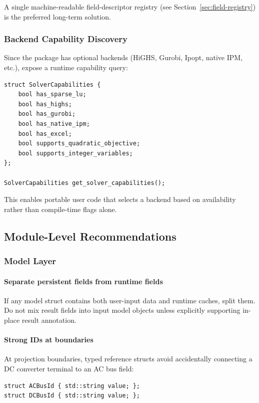 A single machine-readable field-descriptor registry
(see Section~\ref{sec:field-registry}) is the preferred long-term solution.

\subsubsection{Backend Capability Discovery}

Since the package has optional backends (HiGHS, Gurobi, Ipopt, native IPM,
etc.), expose a runtime capability query:

\begin{verbatim}
struct SolverCapabilities {
    bool has_sparse_lu;
    bool has_highs;
    bool has_gurobi;
    bool has_native_ipm;
    bool has_excel;
    bool supports_quadratic_objective;
    bool supports_integer_variables;
};

SolverCapabilities get_solver_capabilities();
\end{verbatim}

This enables portable user code that selects a backend based on availability
rather than compile-time flags alone.

\subsection{Module-Level Recommendations}
\label{sec:module-recommendations}

\subsubsection{Model Layer}

\paragraph{Separate persistent fields from runtime fields}
If any model struct contains both user-input data and runtime caches, split
them.  Do not mix result fields into input model objects unless explicitly
supporting in-place result annotation.

\paragraph{Strong IDs at boundaries}
At projection boundaries, typed reference structs avoid accidentally
connecting a DC converter terminal to an AC bus field:
\begin{verbatim}
struct ACBusId { std::string value; };
struct DCBusId { std::string value; };
\end{verbatim}

